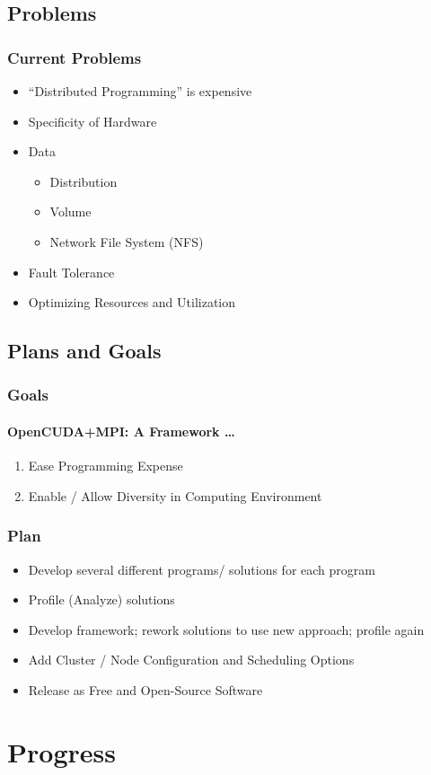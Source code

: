 \documentclass{beamer}
\begin{document}
\subsection{Problems}
\begin{frame}
\frametitle{Current Problems}
\begin{itemize}
\item{``Distributed Programming'' is expensive}
\item{Specificity of Hardware}
\item{Data}
\begin{itemize}
\item{Distribution}
\item{Volume}
\item{Network File System (NFS)}
\end{itemize}
\item{Fault Tolerance}
\item{Optimizing Resources and Utilization}
\end{itemize}
\end{frame}
\subsection{Plans and Goals}
\begin{frame}
\frametitle{Goals}
\framesubtitle{OpenCUDA+MPI\@: A Framework \dots{}}
\begin{enumerate}
\item{Ease Programming Expense}
\item{Enable / Allow Diversity in Computing Environment}
\end{enumerate}
\end{frame}
\begin{frame}
\frametitle{Plan}
\begin{itemize}
\item{Develop several different programs/ solutions for each program}
\item{Profile (Analyze) solutions}
\item{Develop framework; rework solutions to use new approach; profile again}
\item{Add Cluster / Node Configuration and Scheduling Options}
\item{Release as Free and Open-Source Software}
\end{itemize}
\end{frame}
\section{Progress}
\end{document}
